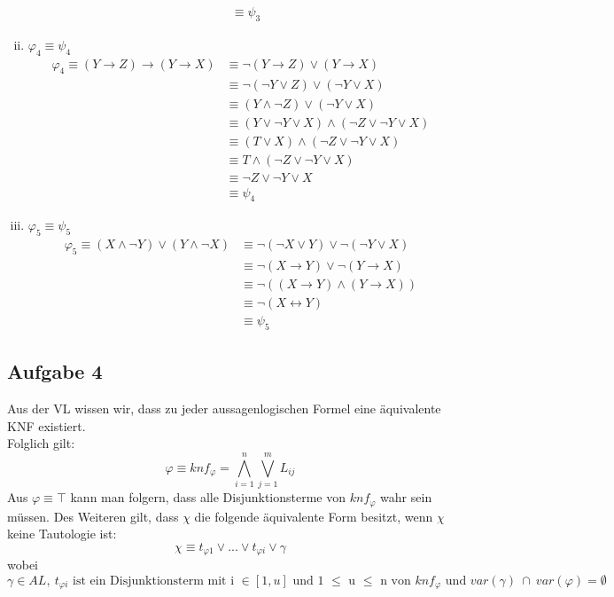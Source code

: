 \documentclass[a4paper,10pt]{article}
\begin{document}
\begin{enumerate}[(i)]
\begin{align*}
	&\equiv \psi_3 
	\end{align*}
\item $\varphi_4 \equiv \psi_4$
	\begin{align*}
	\varphi_4 \equiv (Y \rightarrow Z) \rightarrow (Y \rightarrow X) 
	&\equiv \neg (Y \rightarrow Z) \vee (Y \rightarrow X) \\
	&\equiv \neg (\neg Y \vee Z) \vee (\neg Y \vee X) \\
	&\equiv (Y \wedge \neg Z) \vee (\neg Y \vee X) \\
	&\equiv (Y \vee \neg Y \vee X) \wedge (\neg Z \vee \neg Y \vee X)\\
	&\equiv (T \vee X) \wedge (\neg Z \vee \neg Y \vee X)\\
	&\equiv T \wedge (\neg Z \vee \neg Y \vee X)\\
	&\equiv \neg Z \vee \neg Y \vee X\\
	&\equiv \psi_4 
	\end{align*}
\item $\varphi_5 \equiv \psi_5$
	\begin{align*}
	\varphi_5 \equiv (X \wedge\neg Y) \vee (Y \wedge \neg X) 
	&\equiv \neg (\neg X \vee Y) \vee \neg (\neg Y \vee X) \\
	&\equiv \neg (X \rightarrow Y) \vee \neg (Y \rightarrow X) \\
	&\equiv \neg ((X \rightarrow Y) \wedge (Y \rightarrow X)) \\
	&\equiv \neg (X \leftrightarrow Y) \\
	&\equiv \psi_5 
	\end{align*}
\end{enumerate}
\newpage
	\subsection*{Aufgabe 4}
	Aus der VL wissen wir, dass zu jeder aussagenlogischen Formel eine äquivalente KNF existiert. \\
	Folglich gilt: $$\varphi \equiv knf_{\varphi} = \bigwedge\limits_{i=1}^{n} \bigvee\limits_{j=1}^{m} L_{ij}$$ 
	Aus $\varphi \equiv \top$ kann man folgern, dass alle Disjunktionsterme von $knf_{\varphi}$ wahr sein müssen. Des Weiteren gilt, dass $\chi$ die folgende äquivalente Form besitzt, wenn $\chi$ keine Tautologie ist:
	$$ \chi \equiv t_{\varphi 1} \vee ... \vee  t_{\varphi i} \vee \gamma$$ 
	wobei
	$\gamma \in AL,~t_{\varphi i} \text{ ist ein Disjunktionsterm
	mit i $\in [1,u]$ und 1 $\leq$ u $\leq$ n von } 
	knf_{\varphi} \text{ und } var(\gamma) ~\cap~ var(\varphi) = \emptyset $
	\\
	
\end{document}
